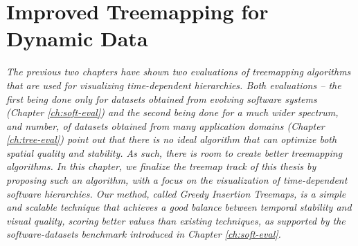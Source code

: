 \chapter{Improved Treemapping for Dynamic Data}
\label{ch:git}


\textit{
The previous two chapters have shown two evaluations of treemapping algorithms that are used for visualizing time-dependent hierarchies. Both evaluations -- the first being done only for datasets obtained from evolving software systems (Chapter \ref{ch:soft-eval}) and the second being done for a much wider spectrum, and number, of datasets obtained from many application domains (Chapter \ref{ch:tree-eval}) point out that there is no ideal algorithm that can optimize both spatial quality and stability. As such, there is room to create better treemapping algorithms. In this chapter, we finalize the treemap track of this thesis by proposing such an algorithm, with a focus on the visualization of time-dependent software hierarchies. Our method, called \emph{Greedy Insertion Treemaps}, is a simple and scalable technique that achieves a good balance between temporal stability and visual quality, scoring better values than existing techniques, as supported by the software-datasets benchmark introduced in Chapter \ref{ch:soft-eval}. 
}



\vspace{5mm} %

